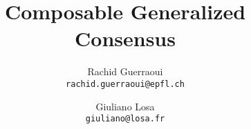 




\title{Composable Generalized Consensus}

\author{
  Rachid Guerraoui\\
  \texttt{rachid.guerraoui@epfl.ch}
  \and
  Giuliano Losa\\
  \texttt{giuliano@losa.fr}
}

\date{}



\maketitle



\newpage





